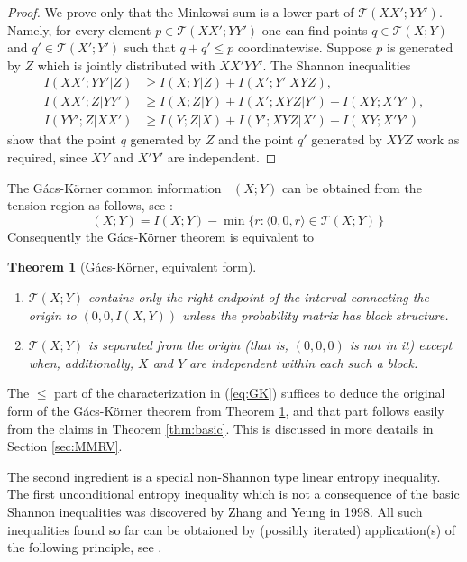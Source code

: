 \documentclass{IEEEtran}
\makeatletter
\def\correcthref{\hyper@anchor{\@currentHref}}
\newtheorem{theorem}{Theorem}
\newcommand\T{\mathcal{T}}
\DeclareMathOperator\GK{C_{\mathsf{GK}}}
\newcommand\I{I\xspace}
\renewcommand{\ge}{\geqslant}
\renewcommand{\le}{\leqslant}
\makeatother
\begin{document}
\begin{proof}
We prove only that the Minkowsi sum is a lower part of $\T(XX';YY')$.
Namely, for every element $p\in
\T(XX';YY')$ one can find points $q\in\T(X;Y)$ and $q'\in\T(X';Y')$ such
that $q+q'\le p$ coordinatewise. Suppose $p$ is generated by $Z$ which is
jointly distributed with $XX'YY'$. The Shannon inequalities
\begin{align*}
\I(XX';YY'|Z) &\ge \I(X;Y|Z) + \I(X';Y'|XYZ), \\
\I(XX';Z|YY') &\ge \I(X;Z|Y) + \I(X';XYZ|Y')-\I(XY;X'Y'), \\
\I(YY';Z|XX') &\ge \I(Y;Z|X) + \I(Y';XYZ|X')-\I(XY;X'Y')
\end{align*}
show that the point $q$ generated by $Z$ and the point $q'$ generated by
$XYZ$ work as required, since $XY$ and $X'Y'$ are independent.
\end{proof}

The G\'acs-K\"orner common information 
$\GK(X;Y)$ can be obtained from the tension region as follows, see
\cite[Corollary 3.3]{PP14}:
\begin{equation}\label{eq:GK}
  \GK(X;Y)=\I(X;Y) - \min\{ r: \langle 0,0,r\rangle \in\T(X;Y) \,\}
\end{equation}
Consequently the G\'acs-K\"orner theorem \cite{gacs-korner} is equivalent to
\begin{theorem}[G\'acs-K\"orner, equivalent form]\correcthref\label{thm:alt}
\begin{enumerate}
\item $\T(X;Y)$
contains only the right endpoint of the interval connecting the origin to
$(0,0,\I(X,Y))$
unless the probability matrix has block structure.
\item $\T(X;Y)$
is separated from the origin (that is, $(0,0,0)$ is not in it) except when,
additionally, $X$ and $Y$ are independent within each such a block.
\end{enumerate}
\end{theorem}

The $\le$ part of the characterization in (\ref{eq:GK}) suffices to deduce
the original form of the G\'acs-K\"orner theorem from Theorem \ref{thm:alt},
and that part follows easily from the claims in Theorem \ref{thm:basic}.
This is discussed in more deatails in Section \ref{sec:MMRV}.

\smallskip

The second ingredient is a special non-Shannon type linear entropy
inequality. The first unconditional entropy inequality which is not a
consequence of the basic Shannon inequalities was discovered by Zhang and
Yeung \cite{ZhY.ineq} in 1998. All such inequalities found so far can be
obtaioned by (possibly iterated) application(s) of the following principle,
see \cite{tarik}.
\end{document}
